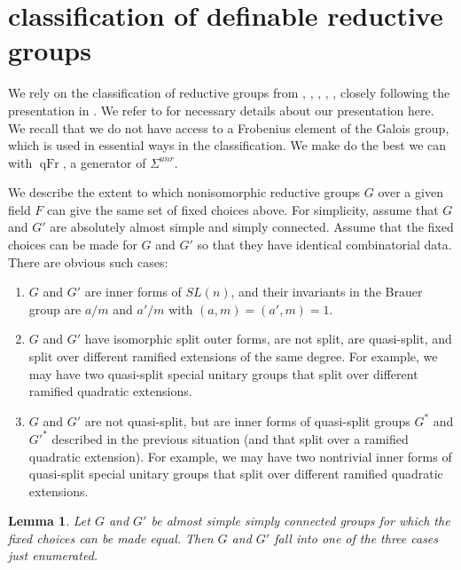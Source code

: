 \documentclass[12pt]{amsart}
\newcommand{\op}[1]{\operatorname{#1}}
\theoremstyle{plain}
\newtheorem{lem}[thm]{Lemma}
\theoremstyle{definition}
\begin{document}
\section{classification of definable reductive groups}\label{sec:classification}

We rely on the classification of reductive groups from \cite{Gille},
\cite{Tits}, \cite{Sel}, \cite{Petrov}, \cite{Reeder}, closely following the
presentation in \cite{Gross}.  We refer to \cite{Gross} for necessary
details about our presentation here.  We recall that we do not have
access to a Frobenius element of the Galois group, which is used in
essential ways in the classification.  We make do the best we can with
$\op{qFr}$, a generator of $\Sigma^{unr}$.

We describe the extent to which nonisomorphic reductive groups $G$
over a given field $F$ can give the same set of fixed choices above.
For simplicity, assume that $G$ and $G'$ are absolutely almost simple
and simply connected.  Assume that the fixed choices can be made for
$G$ and $G'$ so that they have identical combinatorial data.  There
are obvious such cases:
\begin{enumerate}
\item $G$ and $G'$ are inner forms of $SL(n)$, and their invariants in
  the Brauer group are $a/m$ and $a'/m$ with $(a,m)=(a',m)=1$.
\item $G$ and $G'$ have isomorphic split outer forms, are not split,
  are quasi-split, and split over different ramified
  extensions of the same degree.  For example, we may have two
  quasi-split special unitary groups that split over different
  ramified quadratic extensions.
\item $G$ and $G'$ are not quasi-split, but are inner forms of
  quasi-split groups $G^*$ and $G'^{*}$ described in the previous
  situation (and that split over a ramified quadratic extension).  
  For example, we may have two nontrivial inner forms of
  quasi-split special unitary groups that split over different
  ramified quadratic extensions.
\end{enumerate}

\begin{lem} Let $G$ and $G'$ be almost simple simply connected groups
  for which the fixed choices can be made equal.  Then $G$ and $G'$
  fall into one of the three cases just enumerated.
\end{lem}
\end{document}
